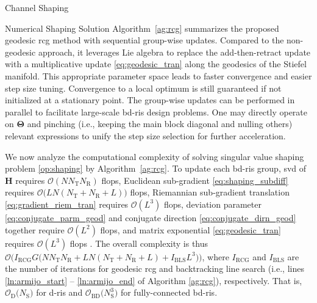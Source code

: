 \documentclass[journal]{IEEEtran}
\begin{document}
\begin{section}{Channel Shaping}
\begin{subsection}{Numerical Shaping Solution}
		Algorithm~\ref{ag:rcg} summarizes the proposed geodesic \gls{rcg} method with sequential group-wise updates.
		Compared to the non-geodesic approach, it leverages Lie algebra to replace the add-then-retract update with a multiplicative update \eqref{eq:geodesic_tran} along the geodesics of the Stiefel manifold.
		This appropriate parameter space leads to faster convergence and easier step size tuning.
		Convergence to a local optimum is still guaranteed if not initialized at a stationary point.
		The group-wise updates can be performed in parallel to facilitate large-scale \gls{bd}-\gls{ris} design problems.
		One may directly operate on $\mathbf{\Theta}$ and pinching (i.e., keeping the main block diagonal and nulling others) relevant expressions to unify the step size selection for further acceleration.

		We now analyze the computational complexity of solving singular value shaping problem \eqref{op:shaping} by Algorithm~\ref{ag:rcg}.
		To update each \gls{bd}-\gls{ris} group, \gls{svd} of $\mathbf{H}$ requires $\mathcal{O}(N N_\mathrm{T} N_\mathrm{R})$ flops, Euclidean sub-gradient \eqref{eq:shaping_subdiff} requires $\mathcal{O}\bigl(L N (N_\mathrm{T}+N_\mathrm{R}+L) \bigr)$ flops, Riemannian sub-gradient translation \eqref{eq:gradient_riem_tran} requires $\mathcal{O}(L^3)$ flops, deviation parameter \eqref{eq:conjugate_parm_geod} and conjugate direction \eqref{eq:conjugate_dirn_geod} together require $\mathcal{O}(L^2)$ flops, and matrix exponential \eqref{eq:geodesic_tran} requires $\mathcal{O}(L^3)$ flops \cite{Moler2003}.
		The overall complexity is thus $\mathcal{O}\bigl(I_\text{RCG} G \bigl(N N_\mathrm{T} N_\mathrm{R} + L N (N_\mathrm{T}+N_\mathrm{R}+L) + I_\text{BLS} L^3\bigr)\bigr)$, where $I_\text{RCG}$ and $I_\text{BLS}$ are the number of iterations for geodesic \gls{rcg} and backtracking line search (i.e., lines \ref{ln:armijo_start} -- \ref{ln:armijo_end} of Algorithm \ref{ag:rcg}), respectively.
		That is, $\mathcal{O}_\mathrm{D}\bigl(N_\mathrm{S}\bigr)$ for \gls{d}-\gls{ris} and $\mathcal{O}_\mathrm{BD}\bigl(N_\mathrm{S}^3\bigr)$ for fully-connected \gls{bd}-\gls{ris}.


\end{subsection}
\end{section}
\end{document}
